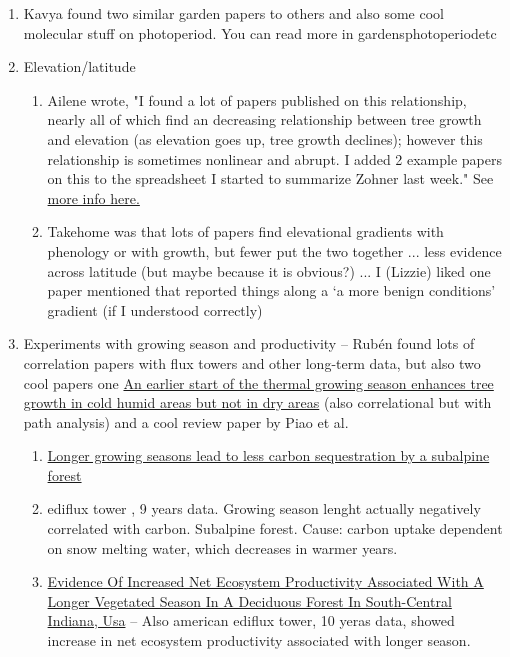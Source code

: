 \documentclass[11pt,letter]{article}
\begin{document}
\begin{enumerate}
\begin{enumerate}
\end{enumerate}
\item Kavya found two similar garden papers to others and also some cool molecular stuff on photoperiod. You can read more in gardensphotoperiodetc
\item Elevation/latitude
\begin{enumerate}
\item Ailene wrote, "I found a lot of papers published on this relationship, nearly all of which find an decreasing relationship between tree growth and elevation (as elevation goes up, tree growth declines); however this relationship is sometimes nonlinear and abrupt. I added 2 example papers on this to the spreadsheet I started to summarize Zohner last week." See \href{https://docs.google.com/spreadsheets/d/1FnjkA6pQbnRd8rtbZzklJBym7ZT6b7FZg7flllBCGA8/edit#gid=0}{more info here.}
\item Takehome was that lots of papers find elevational gradients with phenology or with growth, but fewer put the two together ... less evidence across latitude (but maybe because it is obvious?) ... I (Lizzie) liked one paper mentioned that reported things along a `a more benign conditions' gradient (if I understood correctly)
\end{enumerate}
\item Experiments with growing season and productivity -- Rub\'en found lots of correlation papers with flux towers and other long-term data, but also two cool papers one \href{https://www.nature.com/articles/s41559-022-01668-4}{An earlier start of the thermal growing season enhances tree growth in cold humid areas but not in dry areas} (also correlational but with path analysis) and a cool review paper by Piao et al. 
\begin{enumerate}
\item \href{https://onlinelibrary.wiley.com/doi/full/10.1111/j.1365-2486.2009.01967.x?casa_token=ooGXVV4HiFcAAAAA%3AY5k7eX_YF5Fvaf1LezYftgjMz5SjMq80rHwTm0k3iMlT6n_h3UvDnQfxhrCP4obNLgkrY7Fd9YhbTpHP3Q}{Longer growing seasons lead to less carbon sequestration by a subalpine forest}
\item ediflux tower , 9 years data. Growing season lenght actually negatively correlated with carbon. Subalpine forest. 
Cause: carbon uptake dependent on snow melting water, which decreases in warmer years.
\item \href{https://ameriflux.lbl.gov/community/publication/evidence-of-increased-net-ecosystem-productivity-associated-with-a-longer-vegetated-season-in-a-deciduous-forest-in-south-central-indiana-usa/}{Evidence Of Increased Net Ecosystem Productivity Associated With A Longer Vegetated Season In A Deciduous Forest In South-Central Indiana, Usa} -- Also american ediflux tower, 10 yeras data, showed increase in net ecosystem productivity associated with longer season. 

\end{enumerate}
\end{enumerate}
\end{document}
